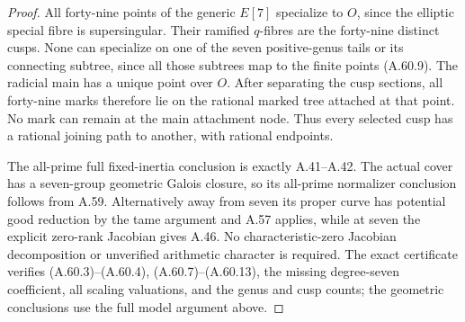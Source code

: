 \begin{proof}
All forty-nine points of the generic \(E[7]\)
specialize to \(O\), since the elliptic special
fibre is supersingular. Their ramified \(q\)-fibres
are the forty-nine distinct cusps. None can
specialize on one of the seven positive-genus
tails or its connecting subtree, since all
those subtrees map to the finite points (A.60.9).
The radicial main has a unique point over \(O\).
After separating the cusp sections, all forty-nine
marks therefore lie on the rational marked tree
attached at that point. No mark can remain at
the main attachment node. Thus every selected
cusp has a rational joining path to another,
with rational endpoints.

The all-prime full fixed-inertia conclusion is
exactly A.41--A.42. The actual cover has a
seven-group geometric Galois closure, so its
all-prime normalizer conclusion follows from
A.59. Alternatively away from seven its proper
curve has potential good reduction by the tame
argument and A.57 applies, while at seven the
explicit zero-rank Jacobian gives A.46. No
characteristic-zero Jacobian decomposition or
unverified arithmetic character is required. The exact
certificate verifies (A.60.3)--(A.60.4), (A.60.7)--(A.60.13),
the missing degree-seven coefficient, all scaling valuations,
and the genus and cusp counts; the geometric conclusions
use the full model argument above.
\end{proof}
